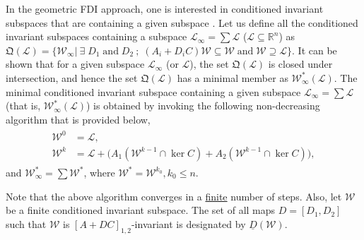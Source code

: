 \documentclass[journal,12pt,draftcls,onecolumn]{IEEEtran}
\newcommand{\ssp}[1]{\mathscr{#1}}      \newcommand{\setssp}[1]{\mathfrak{#1}}   \newcommand{\fld}[1]{\mathbb{#1}}       \newcommand{\op}[1]{\mathcal{#1}}       \newcommand{\sumbanach}[1]{\sum{#1}}
\begin{document}
In the geometric FDI approach, one is interested in conditioned invariant subspaces that are containing a given subspace \cite{Massoumnia1989}. Let us define all the conditioned invariant subspaces containing a subspace $\ssp{L}_\infty = \sum \ssp{L}$ ($\ssp{L}\subseteq\fld{R}^n$) as  $\mathfrak{Q}(\ssp{L}) = \{\ssp{W}_\infty| \ \exists\; D_1\;\mathrm{and}\; D_2 \ ;\; (A_i+D_iC)\ssp{W}\subseteq\ssp{W}\; \mathrm{and}\; \ssp{W}\supseteq\ssp{L} \}$.  It can be shown that for a given subspace $\ssp{L}_\infty$ (or $\ssp{L}$), the set $\mathfrak{Q}(\ssp{L})$ is closed under intersection, and hence the set $\mathfrak{Q}(\ssp{L})$ has a minimal member as $\ssp{W}_\infty^{*}(\ssp{L})$. The minimal conditioned invariant subspace containing a given subspace $\ssp{L_\infty}=\sum \ssp{L}$ (that is, $\ssp{W}_\infty^{*}(\ssp{L})$) is obtained by invoking the following non-decreasing algorithm that is provided below,
\begin{eqnarray}\label{Eq:CIAlg}
	\begin{split}
		\ssp{W}^0 &= \ssp{L},\\
		\ssp{W}^k &= \ssp{L} + \big(A_1(\ssp{W}^{k-1}\cap\ker C)+ A_2(\ssp{W}^{k-1}\cap\ker C)\big),
	\end{split}
\end{eqnarray}
and $\ssp{W}_\infty^* = \sum\ssp{W}^*$, where $\ssp{W}^*=\ssp{W}^{k_0}, k_0\leq n$. 

Note that the above algorithm converges in a \underline{finite} number of steps. Also, let $\ssp{W}$ be a finite conditioned invariant subspace.  The set of all maps $D = [D_1, D_2]$ such that $\ssp{W}$ is $[A+DC]_{1,2}$-invariant is designated by $\underline{D}(\ssp{W})$.
\end{document}
